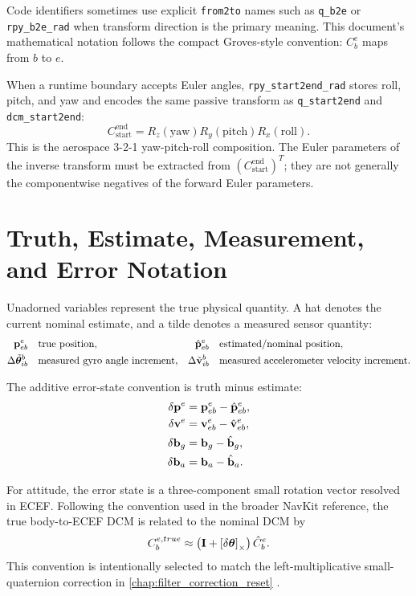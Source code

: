 \begin{warningbox}
Code identifiers sometimes use explicit \texttt{from2to} names such as
\texttt{q\_b2e} or \texttt{rpy\_b2e\_rad} when transform direction is the
primary meaning. This document's mathematical notation follows the compact
Groves-style convention: $C_b^e$ maps from $b$ to $e$.
\end{warningbox}

When a runtime boundary accepts Euler angles,
\texttt{rpy\_start2end\_rad} stores roll, pitch, and yaw and encodes the same
passive transform as \texttt{q\_start2end} and \texttt{dcm\_start2end}:
\begin{equation}
C_{\mathrm{start}}^{\mathrm{end}}
=
R_z(\mathrm{yaw})R_y(\mathrm{pitch})R_x(\mathrm{roll}).
\end{equation}
This is the aerospace 3-2-1 yaw-pitch-roll composition. The Euler parameters
of the inverse transform must be extracted from
$\left(C_{\mathrm{start}}^{\mathrm{end}}\right)^T$; they are not generally the
componentwise negatives of the forward Euler parameters.

\section{Truth, Estimate, Measurement, and Error Notation}

Unadorned variables represent the true physical quantity. A hat denotes the
current nominal estimate, and a tilde denotes a measured sensor quantity:
\begin{align}
\mathbf{p}_{eb}^{e} & && \text{true position},&
\hat{\mathbf{p}}_{eb}^{e} & && \text{estimated/nominal position},\\
\Delta\tilde{\boldsymbol\theta}_{ib}^{b} & && \text{measured gyro angle increment},&
\Delta\tilde{\mathbf{v}}_{ib}^{b} & && \text{measured accelerometer velocity increment}.
\end{align}

The additive error-state convention is truth minus estimate:
\begin{align}
\delta\mathbf{p}^{e} &= \mathbf{p}_{eb}^{e}-\hat{\mathbf{p}}_{eb}^{e},\\
\delta\mathbf{v}^{e} &= \mathbf{v}_{eb}^{e}-\hat{\mathbf{v}}_{eb}^{e},\\
\delta\mathbf{b}_g &= \mathbf{b}_g-\hat{\mathbf{b}}_g,\\
\delta\mathbf{b}_a &= \mathbf{b}_a-\hat{\mathbf{b}}_a.
\end{align}

For attitude, the error state is a three-component small rotation vector
resolved in ECEF. Following the convention used in the broader NavKit
reference, the true body-to-ECEF DCM is related to the nominal DCM by
\begin{equation}
C_b^{e,true}
\approx
\left(\mathbf{I}+\left[\delta\boldsymbol\theta\right]_{\times}\right)
\hat{C}_b^e.
\label{eq:v1_attitude_error_dcm_relation}
\end{equation}
This convention is intentionally selected to match the left-multiplicative
small-quaternion correction in \cref{chap:filter_correction_reset}
\cite{groves2013,sola2018}.

